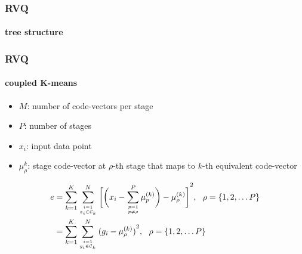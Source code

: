 \begin{frame}
\frametitle{RVQ}
\framesubtitle{tree structure}
\logoCSIPCPL\mypagenum
\begin{figure}[t]
\centering
{}
\end{figure}
\end{frame}




\begin{frame}[plain]
\frametitle{RVQ}
\framesubtitle{coupled K-means}
\logoCSIPCPL\mypagenum
	\begin{itemize}
	\item $M$: number of code-vectors per stage
	\item $P$: number of stages
	\item $x_i$: input data point
	\item $\mu_\rho^k$: stage code-vector at $\rho$-th stage that maps to $k$-th equivalent code-vector
	\end{itemize}
	\begin{changemargin}{-1.3in}{0in}
	\begin{align}
	\label{Eq:RVQmeans}
	e&= \KmeansSum{\bigg[\RVQmultipleKmeansonealternate\bigg]}^2, \ \ \rho=\{1, 2, \ldots P\}\notag\\
	&={\RVQerroralternate}, \ \ \rho=\{1, 2, \ldots P\}
	\end{align}
	\end{changemargin}
\end{frame}

